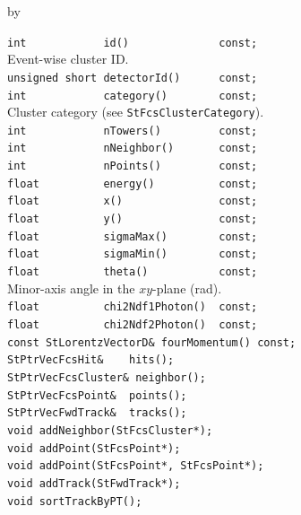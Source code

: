 \documentclass[twoside]{article}
\newcommand{\entrylabel}[1]{\mbox{\textbf{{#1}}}\hfil}%
\newenvironment{entry}
{\begin{list}{}%
    {\renewcommand{\makelabel}{\entrylabel}%
     \setlength{\labelwidth}{90pt}%
     \setlength{\leftmargin}{\labelwidth}
     \advance\leftmargin by \labelsep%
      }%
    }%
  {\end{list}}
\newcommand{\Entrylabel}[1]%
{\raisebox{0pt}[1ex][0pt]{\makebox[\labelwidth][l]%
    {\parbox[t]{\labelwidth}{\hspace{0pt}\textbf{{#1}}}}}}
\newenvironment{Entry}%
{\renewcommand{\entrylabel}{\Entrylabel}\begin{entry}}%
  {\end{entry}}
\begin{document}
\begin{Entry}
\item[Public Member\\ Functions]
    \verb+int            id()              const;+\\
        Event-wise cluster ID.\\
    \verb+unsigned short detectorId()      const;+\\
    \verb+int            category()        const;+\\
        Cluster category (see \texttt{StFcsClusterCategory}).\\
    \verb+int            nTowers()         const;+\\
    \verb+int            nNeighbor()       const;+\\
    \verb+int            nPoints()         const;+\\
    \verb+float          energy()          const;+\\
    \verb+float          x()               const;+\\
    \verb+float          y()               const;+\\
    \verb+float          sigmaMax()        const;+\\
    \verb+float          sigmaMin()        const;+\\
    \verb+float          theta()           const;+\\
        Minor-axis angle in the $xy$-plane (rad).\\
    \verb+float          chi2Ndf1Photon()  const;+\\
    \verb+float          chi2Ndf2Photon()  const;+\\
    \verb+const StLorentzVectorD& fourMomentum() const;+\\
    \verb+StPtrVecFcsHit&    hits();+\\
    \verb+StPtrVecFcsCluster& neighbor();+\\
    \verb+StPtrVecFcsPoint&  points();+\\
    \verb+StPtrVecFwdTrack&  tracks();+\\
    \verb+void addNeighbor(StFcsCluster*);+\\
    \verb+void addPoint(StFcsPoint*);+\\
    \verb+void addPoint(StFcsPoint*, StFcsPoint*);+\\
    \verb+void addTrack(StFwdTrack*);+\\
    \verb+void sortTrackByPT();+\\
\end{Entry}
\clearpage
\end{document}
